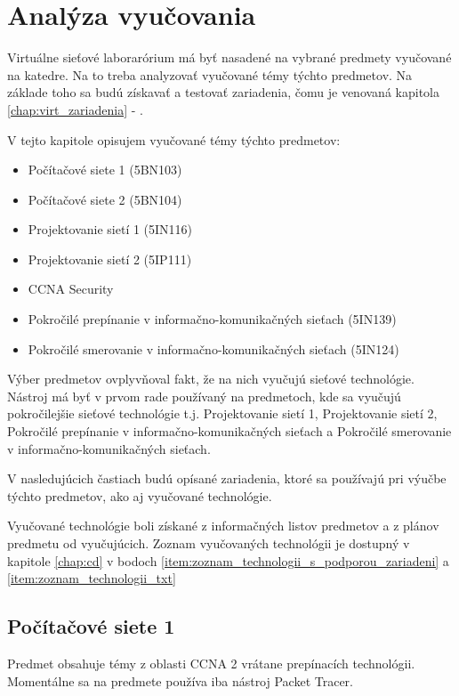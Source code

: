 \chapter{Analýza vyučovania}
\label{chap:analyza_vyucovania}

Virtuálne sieťové laborarórium má byť nasadené na vybrané predmety vyučované na katedre. Na to treba analyzovať vyučované témy týchto predmetov. Na základe toho sa budú získavať a testovať zariadenia, čomu je venovaná kapitola \ref{chap:virt_zariadenia} - .

V tejto kapitole opisujem vyučované témy týchto predmetov:
\begin{itemize}[noitemsep]
    \item Počítačové siete 1 (5BN103)
    \item Počítačové siete 2 (5BN104)
    \item Projektovanie sietí 1 (5IN116)
    \item Projektovanie sietí 2 (5IP111)
    \item CCNA Security
    \item Pokročilé prepínanie v informačno-komunikačných sieťach (5IN139)
    \item Pokročilé smerovanie v informačno-komunikačných sieťach (5IN124)
\end{itemize}

Výber predmetov ovplyvňoval fakt, že na nich vyučujú sieťové technológie. Nástroj má byť v prvom rade používaný na predmetoch, kde sa vyučujú pokročilejšie sieťové technológie t.j. Projektovanie sietí 1, Projektovanie sietí 2, Pokročilé prepínanie v informačno-komunikačných sieťach a Pokročilé smerovanie v informačno-komunikačných sieťach.

V nasledujúcich častiach budú opísané zariadenia, ktoré sa používajú pri výučbe týchto predmetov, ako aj vyučované technológie.

Vyučované technológie boli získané z informačných listov predmetov a z plánov predmetu od vyučujúcich. Zoznam vyučovaných technológii je dostupný v kapitole \ref{chap:cd} v bodoch \ref{item:zoznam_technologii_s_podporou_zariadeni} a \ref{item:zoznam_technologii_txt}




\section{Počítačové siete 1}

Predmet obsahuje témy z oblasti CCNA 2 vrátane prepínacích technológii. Momentálne sa na predmete používa iba nástroj Packet Tracer.


